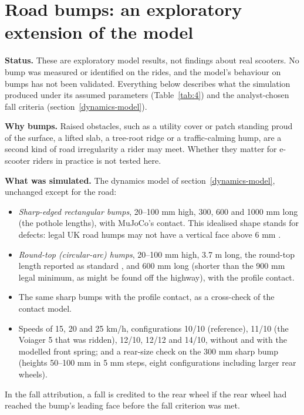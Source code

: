 
\section{Road bumps: an exploratory extension of the model}\label{app:bumps}

\textbf{Status.} These are exploratory model results, not findings about real scooters.
No bump was measured or identified on the rides, and the model's behaviour on bumps has
not been validated. Everything below describes what the simulation produced under its
assumed parameters (Table~\ref{tab:4}) and the analyst-chosen fall criteria
(section~\ref{dynamics-model}).

\textbf{Why bumps.} Raised obstacles, such as a utility cover or patch standing proud of
the surface, a lifted slab, a tree-root ridge or a traffic-calming hump, are a second
kind of road irregularity a rider may meet. Whether they matter for e-scooter riders in
practice is not tested here.

\textbf{What was simulated.} The dynamics model of section~\ref{dynamics-model}, unchanged
except for the road:
\begin{itemize}
\item \emph{Sharp-edged rectangular bumps}, 20--100 mm high, 300, 600 and 1000 mm long (the
  pothole lengths), with MuJoCo's contact. This idealised shape stands for defects: legal
  UK road humps may not have a vertical face above 6 mm \autocite{roadhumps1999}.
\item \emph{Round-top (circular-arc) humps}, 20--100 mm high, 3.7 m long, the round-top
  length reported as standard \autocite{tal2_96}, and 600 mm long (shorter than the 900 mm
  legal minimum, as might be found off the highway), with the profile contact.
\item The same sharp bumps with the profile contact, as a cross-check of the contact model.
\item Speeds of 15, 20 and 25 km/h, configurations 10/10 (reference), 11/10 (the Voiager 5
  that was ridden), 12/10, 12/12 and 14/10, without and with the modelled front spring; and
  a rear-size check on the 300 mm sharp bump (heights 50--100 mm in 5 mm steps, eight
  configurations including larger rear wheels).
\end{itemize}
In the fall attribution, a fall is credited to the rear wheel if the rear wheel had
reached the bump's leading face before the fall criterion was met.

